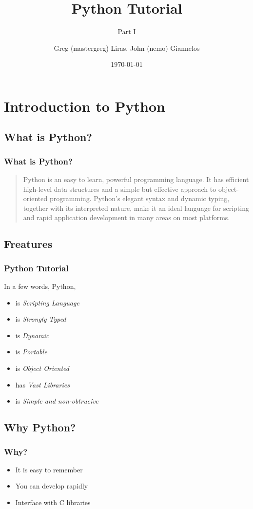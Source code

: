 \documentclass{beamer}
\author[nemo,mastergreg]{Greg (mastergreg) Liras, John (nemo) Giannelos}
\institute{foss.ntua}
\title{Python Tutorial}
\subtitle{Part I}
\date{\today}
\begin{document}
\begin{frame}
	\titlepage
\end{frame}


\section{Introduction to Python}

\subsection{What is Python?}
\begin{frame}
	\frametitle{What is Python?}
\begin{quote}
Python is an easy to learn, powerful programming language. It has efficient
high-level data structures and a simple but effective approach to
object-oriented programming. Python’s elegant syntax and dynamic typing,
together with its interpreted nature, make it an ideal language for scripting
and rapid application development in many areas on most platforms.
\end{quote}
\end{frame}

\subsection{Freatures}
\begin{frame}
	\frametitle{Python Tutorial}

In a few words, Python,
\begin{itemize}
\item<1-> is \emph{Scripting Language}
\item<2-> is \emph{Strongly Typed}
\item<3-> is \emph{Dynamic}
\item<4-> is \emph{Portable}
\item<5-> is \emph{Object Oriented}
\item<6-> has \emph{Vast Libraries}
\item<7-> is \emph{Simple and non-obtrucive}
\end{itemize}

\end{frame}

\subsection{Why Python?}
\begin{frame}
	\frametitle{Why?}
	\begin{itemize}
	\item<1-> It is easy to remember
	\item<2-> You can develop rapidly
	\item<3-> Interface with C libraries
	\end{itemize}
\end{frame}
\end{document}
